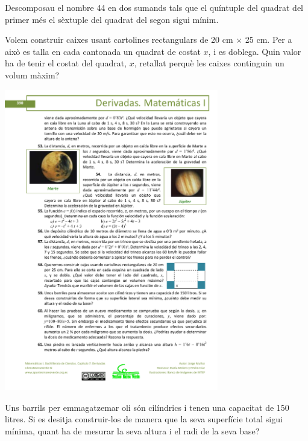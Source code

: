 \begin{mylist}
	
	\exer[-1] Descomposau el nombre 44 en dos sumands tals que el quíntuple del quadrat del primer més el sèxtuple del quadrat del segon sigui mínim.
	
	\begin{minipage}{0.7\textwidth}			
		\exer[-1] Volem construir caixes usant cartolines rectangulars de 20 cm $\times$ 25 cm. Per a això es talla en cada cantonada un quadrat de costat $x$, i es doblega. Quin valor ha de tenir el costat del quadrat, $x$, retallat perquè les caixes continguin un volum màxim? 
	\end{minipage}
	\begin{minipage}{0.3\textwidth}
		\includegraphics*[width=0.7\textwidth]{img-07/chap-deriv-caixa.pdf}	
	\end{minipage}
	
	
	\exer Uns barrils per emmagatzemar oli són cilíndrics i tenen una capacitat de 150 litres. Si es desitja construir-los de manera que la seva superfície total sigui mínima, quant ha de mesurar la seva altura i el radi de la seva base?
	

\end{mylist}
